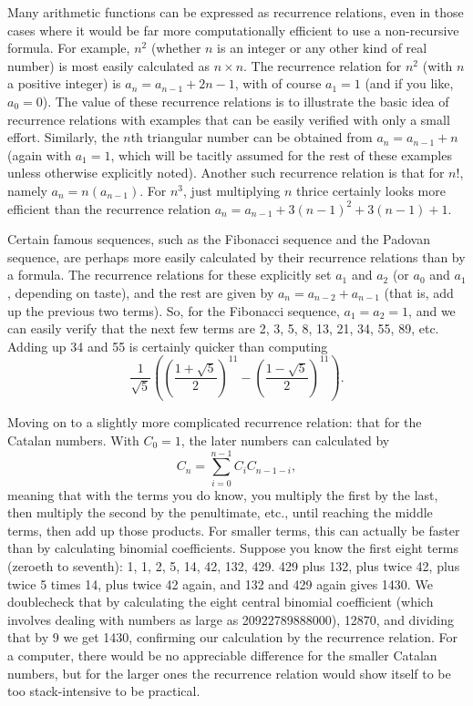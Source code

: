 \documentclass[12pt]{article}
\begin{document}
Many arithmetic functions can be expressed as recurrence relations, even in those cases where it would be far more computationally efficient to use a non-recursive formula. For example, $n^2$ (whether $n$ is an integer or any other kind of real number) is most easily calculated as $n \times n$. The recurrence relation for $n^2$ (with $n$ a positive integer) is $a_n = a_{n - 1} + 2n - 1$, with of course $a_1 = 1$ (and if you like, $a_0 = 0$). The value of these recurrence relations is to illustrate the basic idea of recurrence relations with examples that can be easily verified with only a small effort. Similarly, the $n$th triangular number can be obtained from $a_n = a_{n - 1} + n$ (again with $a_1 = 1$, which will be tacitly assumed for the rest of these examples unless otherwise explicitly noted). Another such recurrence relation is that for $n!$, namely  $a_n = n(a_{n - 1})$. For $n^3$, just multiplying $n$ thrice certainly looks more efficient than the recurrence relation $a_n = a_{n - 1} + 3(n - 1)^2 + 3(n - 1) + 1$.

Certain famous sequences, such as the Fibonacci sequence and the Padovan sequence, are perhaps more easily calculated by their recurrence relations than by a formula. The recurrence relations for these explicitly set $a_1$ and $a_2$ (or $a_0$ and $a_1$, depending on taste), and the rest are given by $a_n = a_{n - 2} + a_{n - 1}$ (that is, add up the previous two terms). So, for the Fibonacci sequence, $a_1 = a_2 = 1$, and we can easily verify that the next few terms are 2, 3, 5, 8, 13, 21, 34, 55, 89, etc. Adding up 34 and 55 is certainly quicker than computing $$\frac{1}{\sqrt{5}}\left(\left(\frac{1 + \sqrt{5}}{2}\right)^{11} - \left(\frac{1 - \sqrt{5}}{2}\right)^{11}\right).$$

Moving on to a slightly more complicated recurrence relation: that for the Catalan numbers. With $C_0 = 1$, the later numbers can calculated by $$C_n = \sum_{i = 0}^{n - 1} C_i C_{n - 1 - i},$$ meaning that with the terms you do know, you multiply the first by the last, then multiply the second by the penultimate, etc., until reaching the middle terms, then add up those products. For smaller terms, this can actually be faster than by calculating binomial coefficients. Suppose you know the first eight terms (zeroeth to seventh): 1, 1, 2, 5, 14, 42, 132, 429. 429 plus 132, plus twice 42, plus twice 5 times 14, plus twice 42 again, and 132 and 429 again gives 1430. We doublecheck that by calculating the eight central binomial coefficient (which involves dealing with numbers as large as 20922789888000), 12870, and dividing that by 9 we get 1430, confirming our calculation by the recurrence relation. For a computer, there would be no appreciable difference for the smaller Catalan numbers, but for the larger ones the recurrence relation would show itself to be too stack-intensive to be practical.
\end{document}
